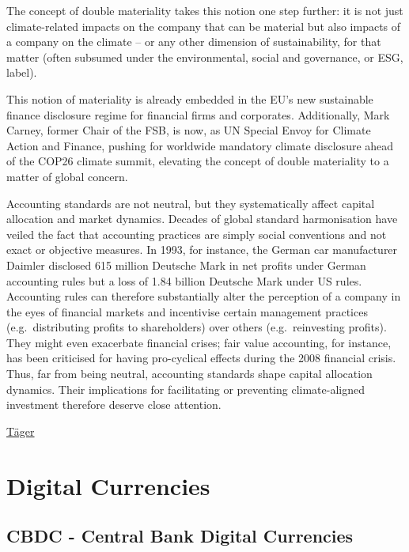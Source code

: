 \documentclass[
]{book}
\begin{document}
The concept of double materiality takes this notion one step further: it is not just climate-related impacts on the company that can be material but also impacts of a company on the climate -- or any other dimension of sustainability, for that matter (often subsumed under the environmental, social and governance, or ESG, label).

This notion of materiality is already embedded in the EU's new sustainable finance disclosure regime for financial firms﻿
and corporates﻿. Additionally, Mark Carney, former Chair of the FSB, is now, as UN Special Envoy for Climate Action and Finance, pushing for worldwide mandatory climate disclosure ahead of the COP26 climate summit, elevating the concept of double materiality to a matter of global concern.

Accounting standards are not neutral, but they systematically affect capital allocation and market dynamics. Decades of global standard harmonisation have veiled the fact that accounting practices are simply social conventions and not exact or objective measures. In 1993, for instance, the German car manufacturer Daimler disclosed 615 million Deutsche Mark in net profits﻿ under German accounting rules but a loss of 1.84 billion Deutsche Mark under US rules. Accounting rules can therefore substantially alter the perception of a company in the eyes of financial markets and incentivise certain management practices (e.g.~distributing profits to shareholders) over others (e.g.~reinvesting profits). They might even exacerbate financial crises; fair value accounting, for instance, has been criticised﻿ for having pro-cyclical effects during the 2008 financial crisis. Thus, far from being neutral, accounting standards shape capital allocation dynamics. Their implications for facilitating or preventing climate-aligned investment therefore deserve close attention.

\href{https://www.lse.ac.uk/granthaminstitute/news/double-materiality-what-is-it-and-why-does-it-matter/}{Täger}

\hypertarget{digital-currencies}{%
\chapter{Digital Currencies}\label{digital-currencies}}

\hypertarget{cbdc---central-bank-digital-currencies}{%
\section{CBDC - Central Bank Digital Currencies}\label{cbdc---central-bank-digital-currencies}}
\end{document}
